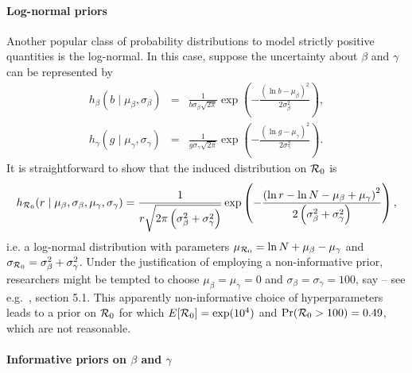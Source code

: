 \documentclass[alpha-refs]{wiley-article}
\newcommand{\rr}{ {\cal R}_0 }						%
\begin{document}
\paragraph{Log-normal priors}

Another popular class of probability distributions to model strictly positive quantities is the log-normal.
In this case, suppose the uncertainty about $\beta$ and $\gamma$ can be represented by
\begin{eqnarray*}
\nonumber
h_{\beta}(b \mid \mu_{\beta}, \sigma_{\beta}) &=& \frac{1}{b \sigma_{\beta}\sqrt{2\pi}} \exp\left( - \frac{ \left( \ln b - \mu_{\beta} \right)^2 }{2 \sigma_{\beta}^2} \right), \\
h_{\gamma}(g \mid \mu_{\gamma}, \sigma_{\gamma}) &=& \frac{1}{g \sigma_{\gamma}\sqrt{2\pi}} \exp\left( - \frac{ \left( \ln g - \mu_{\gamma} \right)^2 }{2 \sigma_{\gamma}^2} \right).
\end{eqnarray*}
It is straightforward to show that the induced distribution on $\rr$ is
\begin{equation}
 \label{eq:r0lognormal}
h_{\rr}( r \mid \mu_{\beta}, \sigma_{\beta}, \mu_{\gamma}, \sigma_{\gamma}) =   \frac{1}{r \sqrt{2\pi \left( \sigma_{\beta}^2 + \sigma_{\gamma}^2 \right) }} \exp\left( - \frac{ \left( \ln r - \ln N - \mu_{\beta} + \mu_{\gamma}  \right)^2 }{2 \left(\sigma_{\beta}^2 + \sigma_{\gamma}^2\right) } \right),
\end{equation}
i.e. a log-normal distribution with parameters $\mu_{\rr} = \ln N + \mu_{\beta} - \mu_{\gamma}$ and $\sigma_{\rr} = \sigma_{\beta}^2 + \sigma_{\gamma}^2$.
Under the justification of employing a non-informative prior, researchers might be tempted to choose $\mu_{\beta} = \mu_{\gamma} = 0$ and $ \sigma_{\beta} = \sigma_{\gamma} = 100$, say -- see e.g.~\cite{Ho2018}, section 5.1.
This apparently non-informative choice of hyperparameters leads to a prior on $\rr$ for which  $E[\rr ] = \exp(10^4)$ and $\text{Pr}(\rr > 100) = 0.49$, which are not reasonable.

\paragraph{Informative priors on $\beta$ and $\gamma$}
\end{document}
